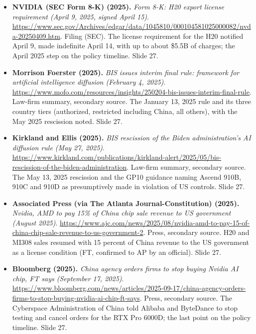\begin{itemize}[leftmargin=1.2em,itemsep=3pt]
\item \textbf{NVIDIA (SEC Form 8-K) (2025).} \textit{Form 8-K: H20 export license requirement (April 9, 2025, signed April 15)}. \url{https://www.sec.gov/Archives/edgar/data/1045810/000104581025000082/nvda-20250409.htm}. Filing (SEC). The license requirement for the H20 notified April 9, made indefinite April 14, with up to about \$5.5B of charges; the April 2025 step on the policy timeline. Slide 27.
\item \textbf{Morrison Foerster (2025).} \textit{BIS issues interim final rule: framework for artificial intelligence diffusion (February 4, 2025)}. \url{https://www.mofo.com/resources/insights/250204-bis-issues-interim-final-rule}. Law-firm summary, secondary source. The January 13, 2025 rule and its three country tiers (authorized, restricted including China, all others), with the May 2025 rescission noted. Slide 27.
\item \textbf{Kirkland and Ellis (2025).} \textit{BIS rescission of the Biden administration's AI diffusion rule (May 27, 2025)}. \url{https://www.kirkland.com/publications/kirkland-alert/2025/05/bis-rescission-of-the-biden-administration}. Law-firm summary, secondary source. The May 13, 2025 rescission and the GP10 guidance naming Ascend 910B, 910C and 910D as presumptively made in violation of US controls. Slide 27.
\item \textbf{Associated Press (via The Atlanta Journal-Constitution) (2025).} \textit{Nvidia, AMD to pay 15\% of China chip sale revenue to US government (August 2025)}. \url{https://www.ajc.com/news/2025/08/nvidia-amd-to-pay-15-of-china-chip-sale-revenue-to-us-government-2}. Press, secondary source. H20 and MI308 sales resumed with 15 percent of China revenue to the US government as a license condition (FT, confirmed to AP by an official). Slide 27.
\item \textbf{Bloomberg (2025).} \textit{China agency orders firms to stop buying Nvidia AI chip, FT says (September 17, 2025)}. \url{https://www.bloomberg.com/news/articles/2025-09-17/china-agency-orders-firms-to-stop-buying-nvidia-ai-chip-ft-says}. Press, secondary source. The Cyberspace Administration of China told Alibaba and ByteDance to stop testing and cancel orders for the RTX Pro 6000D; the last point on the policy timeline. Slide 27.
\end{itemize}
